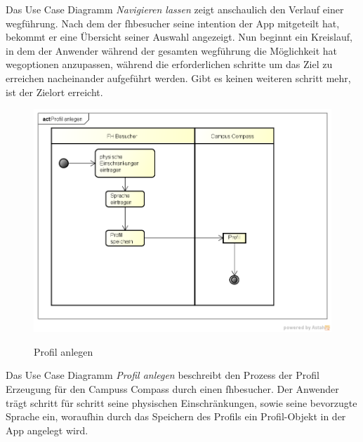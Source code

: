 Das Use Case Diagramm \emph{Navigieren lassen} zeigt anschaulich den Verlauf einer \gls{weg}führung. Nach dem der \gls{fhbesucher} seine \gls{intention} der App mitgeteilt hat, bekommt er eine Übersicht seiner Auswahl angezeigt. Nun beginnt ein Kreislauf, in dem der Anwender während der gesamten \gls{weg}führung die Möglichkeit hat \gls{weg}optionen anzupassen, während die erforderlichen \gls{schritt}e um das Ziel zu erreichen nacheinander aufgeführt werden. Gibt es keinen weiteren \gls{schritt} mehr, ist der Zielort erreicht.

\begin{figure}[hbt]
  \centering
  \includegraphics[width=\linewidth]{img/akt_profil_anlegen.png}
  \label{img:akt_profil_anlegen}
  \caption{Profil anlegen}
\end{figure}

\noindent Das Use Case Diagramm \emph{Profil anlegen} beschreibt den Prozess der Profil Erzeugung für den Campuss Compass durch einen \gls{fhbesucher}. Der Anwender trägt \gls{schritt} für \gls{schritt} seine physischen Einschränkungen, sowie seine bevorzugte Sprache ein, woraufhin durch das Speichern des Profils ein Profil-Objekt in der App angelegt wird.
